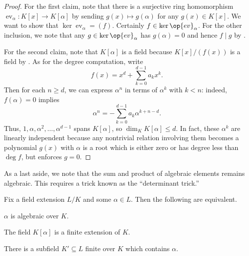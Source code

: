 \documentclass[../notes.tex]{subfiles}
\begin{document}
\begin{proof}
	For the first claim, note that there is a surjective ring homomorphism $\operatorname{ev}_\alpha\colon K[x]\to K[\alpha]$ by sending $g(x)\mapsto g(\alpha)$ for any $g(x)\in K[x]$. We want to show that $\ker{\operatorname{ev}_\alpha}=(f)$. Certainly $f\in\ker\op{ev}_\alpha$. For the other inclusion, we note that any $g\in\ker\op{ev}_\alpha$ has $g(\alpha)=0$ and hence $f\mid g$ by .

	For the second claim, note that $K[\alpha]$ is a field because $K[x]/(f(x))$ is a field by . As for the degree computation, write
	\[f(x)=x^d+\sum_{k=0}^{d-1}a_kx^k.\]
	Then for each $n\ge d$, we can express $\alpha^n$ in terms of $\alpha^k$ with $k<n$: indeed, $f(\alpha)=0$ implies
	\[\alpha^n=-\sum_{k=0}^{d-1}a_k\alpha^{k+n-d}.\]
	Thus, $1,\alpha,\alpha^2,\ldots,\alpha^{d-1}$ spans $K[\alpha]$, so $\dim_KK[\alpha]\le d$. In fact, these $\alpha^k$ are linearly independent because any nontrivial relation involving them becomes a polynomial $g(x)$ with $\alpha$ is a root which is either zero or has degree less than $\deg f$, but  enforces $g=0$.
\end{proof}
As a last aside, we note that the sum and product of algebraic elements remains algebraic. This requires a trick known as the ``determinant trick.''
\begin{proposition} \label{prop:how-to-algebraic}
	Fix a field extension $L/K$ and some $\alpha\in L$. Then the following are equivalent.
	\begin{listalph}
		\item $\alpha$ is algebraic over $K$.
		\item The field $K[\alpha]$ is a finite extension of $K$.
		\item There is a subfield $K'\subseteq L$ finite over $K$ which contains $\alpha$.
	\end{listalph}
\end{proposition}
\end{document}
